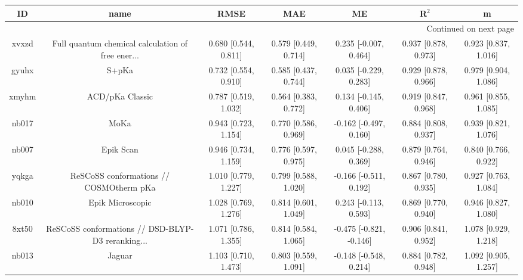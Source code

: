 \documentclass{article}
\begin{document}
\begin{center}
\begin{longtable}{|ccccccc|}
\toprule
    ID &                                               name &                  RMSE &                   MAE &                       ME &                 R$^2$ &                      m \\
\midrule
\endhead
\midrule
\multicolumn{7}{r}{{Continued on next page}} \\
\midrule
\endfoot

\bottomrule
\endlastfoot
 xvxzd &  Full quantum chemical calculation of free ener... &  0.680 [0.544, 0.811] &  0.579 [0.449, 0.714] &    0.235 [-0.007, 0.464] &  0.937 [0.878, 0.973] &   0.923 [0.837, 1.016] \\
 gyuhx &                                              S+pKa &  0.732 [0.554, 0.910] &  0.585 [0.437, 0.744] &    0.035 [-0.229, 0.283] &  0.929 [0.878, 0.966] &   0.979 [0.904, 1.086] \\
 xmyhm &                                    ACD/pKa Classic &  0.787 [0.519, 1.032] &  0.564 [0.383, 0.772] &    0.134 [-0.145, 0.406] &  0.919 [0.847, 0.968] &   0.961 [0.855, 1.085] \\
 nb017 &                                               MoKa &  0.943 [0.723, 1.154] &  0.770 [0.586, 0.969] &   -0.162 [-0.497, 0.160] &  0.884 [0.808, 0.937] &   0.939 [0.821, 1.076] \\
 nb007 &                                          Epik Scan &  0.946 [0.734, 1.159] &  0.776 [0.597, 0.975] &    0.045 [-0.288, 0.369] &  0.879 [0.764, 0.946] &   0.840 [0.766, 0.922] \\
 yqkga &            ReSCoSS conformations // COSMOtherm pKa &  1.010 [0.779, 1.227] &  0.799 [0.588, 1.020] &   -0.166 [-0.511, 0.192] &  0.867 [0.780, 0.935] &   0.927 [0.763, 1.084] \\
 nb010 &                                   Epik Microscopic &  1.028 [0.769, 1.276] &  0.814 [0.601, 1.049] &    0.243 [-0.113, 0.593] &  0.869 [0.770, 0.940] &   0.946 [0.827, 1.080] \\
 8xt50 &  ReSCoSS conformations // DSD-BLYP-D3 reranking... &  1.071 [0.786, 1.355] &  0.814 [0.584, 1.065] &  -0.475 [-0.821, -0.146] &  0.906 [0.841, 0.952] &   1.078 [0.929, 1.218] \\
 nb013 &                                             Jaguar &  1.103 [0.710, 1.473] &  0.803 [0.559, 1.091] &   -0.148 [-0.548, 0.214] &  0.884 [0.782, 0.948] &   1.092 [0.905, 1.257] \\

\end{longtable}
\end{center}
\end{document}
